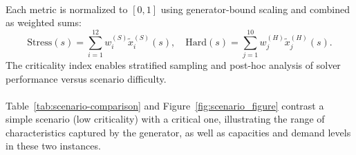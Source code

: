 \documentclass{article}
\begin{document}
\paragraph{}
Each metric is normalized to $[0,1]$ using generator-bound scaling and combined as weighted sums:
\begin{equation}
\mathrm{Stress}(s) = \sum_{i=1}^{12} w_i^{(S)} \tilde{x}_i^{(S)}(s), \quad
\mathrm{Hard}(s) = \sum_{j=1}^{10} w_j^{(H)} \tilde{x}_j^{(H)}(s).
\end{equation}
The criticality index enables stratified sampling and post-hoc analysis of solver performance versus scenario difficulty.

    \paragraph{}
    Table~\ref{tab:scenario-comparison} and Figure~\ref{fig:scenario_figure} contrast a simple scenario (low criticality) with a critical one, illustrating the range of characteristics captured by the generator, as well as capacities and demand levels in these two instances.
    
\end{document}
